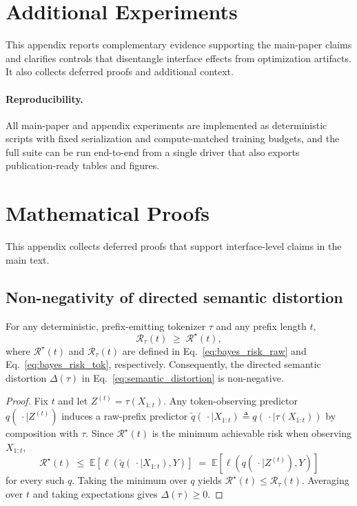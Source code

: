 \appendix

\section{Additional Experiments}
\label{sec:appendix_experiments}

This appendix reports complementary evidence supporting the main-paper claims and clarifies controls that disentangle interface effects from optimization artifacts.
It also collects deferred proofs and additional context.

\paragraph{Reproducibility.}
All main-paper and appendix experiments are implemented as deterministic scripts with fixed serialization and compute-matched training budgets, and the full suite can be run end-to-end from a single driver that also exports publication-ready tables and figures.

\section{Mathematical Proofs}
\label{app:proofs}

This appendix collects deferred proofs that support interface-level claims in the main text.

\subsection{Non-negativity of directed semantic distortion}
\label{app:distortion_nonneg}

\begin{proposition}
\label{prop:distortion_nonneg}
For any deterministic, prefix-emitting tokenizer $\tau$ and any prefix length $t$,
\[
\mathcal{R}_\tau(t) \;\ge\; \mathcal{R}^\star(t),
\]
where $\mathcal{R}^\star(t)$ and $\mathcal{R}_\tau(t)$ are defined in
Eq.~\eqref{eq:bayes_risk_raw} and Eq.~\eqref{eq:bayes_risk_tok}, respectively.
Consequently, the directed semantic distortion $\Delta(\tau)$ in Eq.~\eqref{eq:semantic_distortion} is non-negative.
\end{proposition}

\begin{proof}
Fix $t$ and let $Z^{(t)}=\tau(X_{1:t})$.
Any token-observing predictor $q(\,\cdot \mid Z^{(t)})$ induces a raw-prefix predictor
$\tilde{q}(\,\cdot \mid X_{1:t}) \triangleq q(\,\cdot \mid \tau(X_{1:t}))$ by composition with $\tau$.
Since $\mathcal{R}^\star(t)$ is the minimum achievable risk when observing $X_{1:t}$,
\[
\mathcal{R}^\star(t)
\;\le\;
\mathbb{E}\!\left[\ell\!\left(\tilde{q}(\,\cdot \mid X_{1:t}),Y\right)\right]
\;=\;
\mathbb{E}\!\left[\ell\!\left(q(\,\cdot \mid Z^{(t)}),Y\right)\right]
\]
for every such $q$.
Taking the minimum over $q$ yields $\mathcal{R}^\star(t)\le \mathcal{R}_\tau(t)$.
Averaging over $t$ and taking expectations gives $\Delta(\tau)\ge 0$.
\end{proof}

